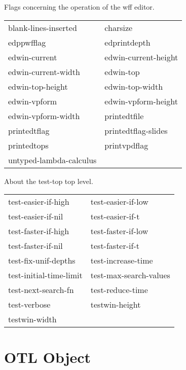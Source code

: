 \begin{description} 
\item[EDITOR]  
Flags concerning the operation of the wff editor.

\begin{tabular}{l l}
blank-lines-inserted&charsize\\
edppwfflag&edprintdepth\\
edwin-current&edwin-current-height\\
edwin-current-width&edwin-top\\
edwin-top-height&edwin-top-width\\
edwin-vpform&edwin-vpform-height\\
edwin-vpform-width&printedtfile\\
printedtflag&printedtflag-slides\\
printedtops&printvpdflag\\
untyped-lambda-calculus
\end{tabular}

\item[TEST-TOP]  
About the test-top top level.

\begin{tabular}{l l}
test-easier-if-high&test-easier-if-low\\
test-easier-if-nil&test-easier-if-t\\
test-faster-if-high&test-faster-if-low\\
test-faster-if-nil&test-faster-if-t\\
test-fix-unif-depths&test-increase-time\\
test-initial-time-limit&test-max-search-values\\
test-next-search-fn&test-reduce-time\\
test-verbose&testwin-height\\
testwin-width
\end{tabular}
\item
\end{description}

\section{OTL Object}

